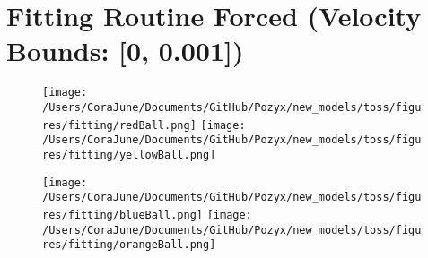 \documentclass{article}
\begin{document}
\section{Fitting Routine Forced (Velocity Bounds: [0, 0.001])}
\begin{figure}[h!]
\begin{multicols}{2}
    \texttt{[image: /Users/CoraJune/Documents/GitHub/Pozyx/new\_models/toss/figures/fitting/redBall.png]}
    \texttt{[image: /Users/CoraJune/Documents/GitHub/Pozyx/new\_models/toss/figures/fitting/yellowBall.png]}
\end{multicols}

\begin{multicols}{2}
    \texttt{[image: /Users/CoraJune/Documents/GitHub/Pozyx/new\_models/toss/figures/fitting/blueBall.png]}
    \texttt{[image: /Users/CoraJune/Documents/GitHub/Pozyx/new\_models/toss/figures/fitting/orangeBall.png]}
\end{multicols}


\end{figure}

\end{document}

